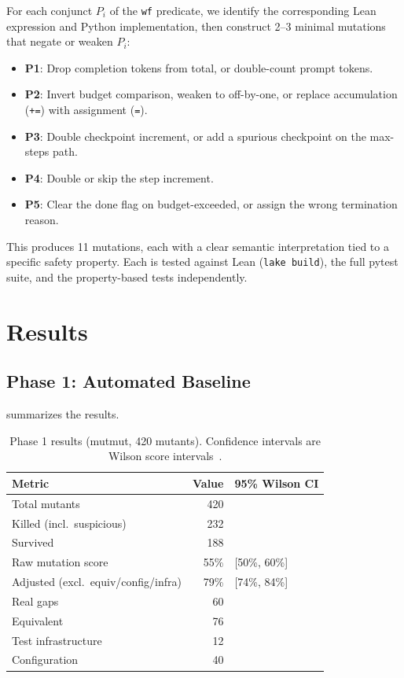 \documentclass[11pt,a4paper]{article}
\begin{document}
For each conjunct $P_i$ of the \texttt{wf} predicate, we identify
the corresponding Lean expression and Python implementation, then
construct 2--3 minimal mutations that negate or weaken $P_i$:

\begin{itemize}[nosep]
  \item \textbf{P1}: Drop completion tokens from total, or
    double-count prompt tokens.
  \item \textbf{P2}: Invert budget comparison, weaken to off-by-one,
    or replace accumulation (\texttt{+=}) with assignment (\texttt{=}).
  \item \textbf{P3}: Double checkpoint increment, or add a spurious
    checkpoint on the max-steps path.
  \item \textbf{P4}: Double or skip the step increment.
  \item \textbf{P5}: Clear the done flag on budget-exceeded, or
    assign the wrong termination reason.
\end{itemize}

This produces 11 mutations, each with a clear semantic interpretation
tied to a specific safety property. Each is tested against Lean
(\texttt{lake build}), the full pytest suite, and the property-based
tests independently.

\section{Results}
\label{sec:results}

\subsection{Phase 1: Automated Baseline}

 summarizes the results.

\begin{table}[htbp]
\centering
\caption{Phase 1 results (mutmut, 420 mutants). Confidence intervals
are Wilson score intervals~\cite{wilson1927probable}.}
\label{tab:phase1}
\small
\begin{tabular}{@{}lrl@{}}
\toprule
\textbf{Metric} & \textbf{Value} & \textbf{95\% Wilson CI} \\
\midrule
Total mutants & 420 & \\
Killed (incl.\ suspicious) & 232 & \\
Survived & 188 & \\
Raw mutation score & 55\% & [50\%, 60\%] \\
Adjusted (excl.\ equiv/config/infra) & 79\% & [74\%, 84\%] \\
\midrule
Real gaps & 60 & \\
Equivalent & 76 & \\
Test infrastructure & 12 & \\
Configuration & 40 & \\
\bottomrule
\end{tabular}
\end{table}
\end{document}

